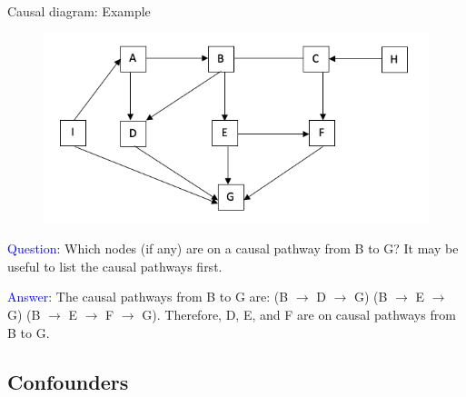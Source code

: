 \documentclass[10pt,t]{beamer}
\begin{document}
\begin{frame}{Causal diagram: Example}

\begin{figure}
	\centering \includegraphics[scale=0.4]{dag1.png}
\end{figure}

\vspace{0.1cm} 

\textcolor{blue}{Question}: Which nodes (if any) are on a causal pathway from B to G? It may be useful to list the causal pathways first. \pause

\vspace{0.1cm}

\textcolor{blue}{Answer}: The causal pathways from B to G are: (B $\to$ D $\to$ G) (B $\to$ E $\to$ G) (B $\to$ E $\to$ F $\to$ G). Therefore, D, E, and F are on causal pathways from B to G.

\end{frame}

\subsection{Confounders}
\end{document}
